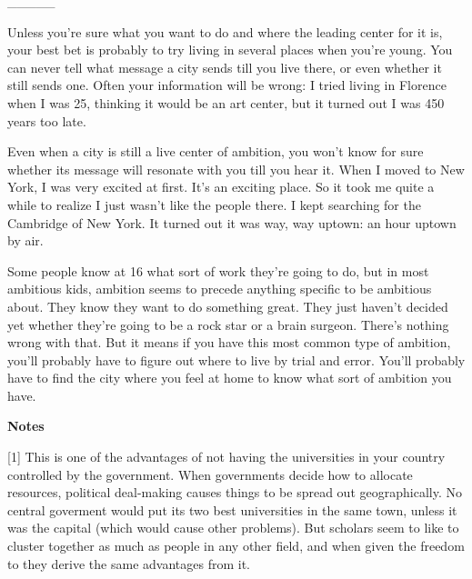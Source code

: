                   \_\_\_\_\_
                  

Unless you're sure what you want to do and where
                  the leading center for it is, your best bet is probably to try
                  living in several places when you're young. You can never tell
                  what message a city sends till you live there, or even whether
                  it still sends one. Often your information will be wrong: I
                  tried living in Florence when I was 25, thinking it would be
                  an art center, but it turned out I was 450 years too late.

Even
                  when a city is still a live center of ambition, you won't know
                  for sure whether its message will resonate with you till you
                  hear it. When I moved to New York, I was very excited at
                  first. It's an exciting place. So it took me quite a while to
                  realize I just wasn't like the people there. I kept searching
                  for the Cambridge of New York. It turned out it was way, way
                  uptown: an hour uptown by air.

Some people know at
                  16 what sort of work they're going to do, but in most
                  ambitious kids, ambition seems to precede anything specific to
                  be ambitious about. They know they want to do something great.
                  They just haven't decided yet whether they're going to be a
                  rock star or a brain surgeon. There's nothing wrong with that.
                  But it means if you have this most common type of ambition,
                  you'll probably have to figure out where to live by trial and
                  error. You'll probably have to find the city where you feel at
                  home to know what sort of ambition you have.







\textbf{Notes}

[1] This is one of the advantages of not having the
                  universities in your country controlled by the government.
                  When governments decide how to allocate resources, political
                  deal-making causes things to be spread out geographically. No
                  central goverment would put its two best universities in the
                  same town, unless it was the capital (which would cause other
                  problems). But scholars seem to like to cluster together as
                  much as people in any other field, and when given the freedom
                  to they derive the same advantages from it.

